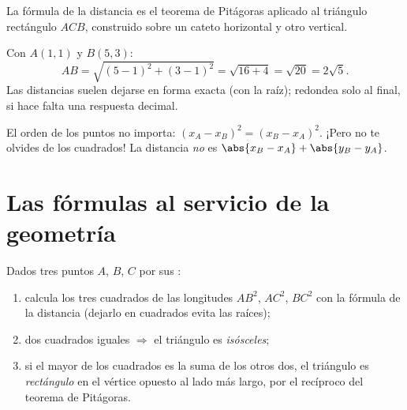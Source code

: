\begin{omfigure}

{\small La fórmula de la distancia es el teorema de Pitágoras aplicado al
triángulo rectángulo $ACB$, construido sobre un cateto horizontal y otro
vertical.}
\end{omfigure}

\begin{example}\label{ex:g10:coordgeom:distance}
Con $A(1, 1)$ y $B(5, 3)$:
\[
AB = \sqrt{(5-1)^2 + (3-1)^2} = \sqrt{16 + 4} = \sqrt{20} = 2\sqrt 5 .
\]
Las distancias suelen dejarse en forma exacta (con la raíz); redondea solo
al final, si hace falta una respuesta decimal.
\end{example}

\begin{remark}
El orden de los puntos no importa: $(x_A - x_B)^2 = (x_B - x_A)^2$. ¡Pero
no te olvides de los cuadrados! La distancia \emph{no} es
$\abs{x_B - x_A} + \abs{y_B - y_A}$.
\end{remark}

\section{Las fórmulas al servicio de la geometría}

\begin{method}\label{met:g10:coordgeom:triangle}
Dados tres puntos $A$, $B$, $C$ por sus :
\begin{enumerate}
  \item calcula los tres cuadrados de las longitudes $AB^2$, $AC^2$,
        $BC^2$ con la fórmula de la distancia (dejarlo en cuadrados evita
        las raíces);
  \item dos cuadrados iguales $\Rightarrow$ el triángulo es
        \emph{isósceles};
  \item si el mayor de los cuadrados es la suma de los otros dos, el
        triángulo es \emph{rectángulo} en el vértice opuesto al lado más
        largo, por el recíproco del teorema de Pitágoras.
\end{enumerate}
\end{method}

